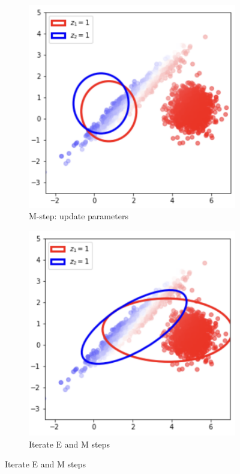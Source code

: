 \documentclass[11pt]{article}
\begin{document}
\begin{figure}[!ht]
	\begin{subfigure}[t]{0.3\textwidth}
		\centering
		\includegraphics[width=\textwidth]{../imgs/gmm_p3.png}
		\caption*{\small M-step: update parameters}
	\end{subfigure}
	\hspace{0.15\textwidth}
	\begin{subfigure}[t]{0.3\textwidth}
		\centering
		\includegraphics[width=\textwidth]{../imgs/gmm_p4.png}
		\caption*{\small Iterate E and M steps}
	\end{subfigure}


\end{figure}
\end{document}
